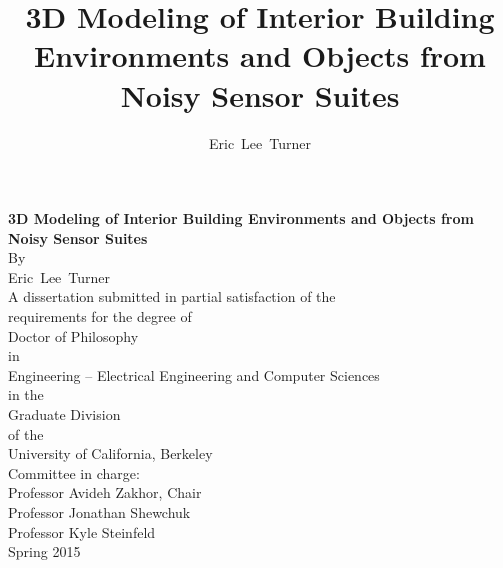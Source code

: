 \documentclass[12pt,onecolumn,oneside]{book}
\begin{document}

%
%
%

\newcommand{\mytitle}{3D Modeling of Interior Building Environments and Objects from Noisy Sensor Suites}
\title{\mytitle}

\newcommand{\myauthor}{Eric~Lee~Turner}
\author{\myauthor}

{\centering
	{\textbf{\mytitle}}\\
	\hfill \break
	\hfill \break
	By\\
	\hfill \break
	\myauthor\\
	\hfill \break
	\hfill \break
	\hfill \break
	A dissertation submitted in partial satisfaction of the\\	
	\hfill \break
	requirements for the degree of\\
	\hfill \break
	Doctor of Philosophy\\
	\hfill \break
	in\\
	Engineering -- Electrical Engineering and Computer Sciences\\	
	\hfill \break 
	in the\\
	\hfill \break
	Graduate Division\\
	\hfill \break
	of the\\
	\hfill \break
	University of California, Berkeley\\
	\hfill \break
	\hfill \break
	\hfill \break
	Committee in charge:\\
	\hfill \break
	Professor Avideh Zakhor, Chair\\
	Professor Jonathan Shewchuk\\
	Professor Kyle Steinfeld\\
	\hfill \break	
	\hfill \break
	Spring 2015\\
}

\end{document}
